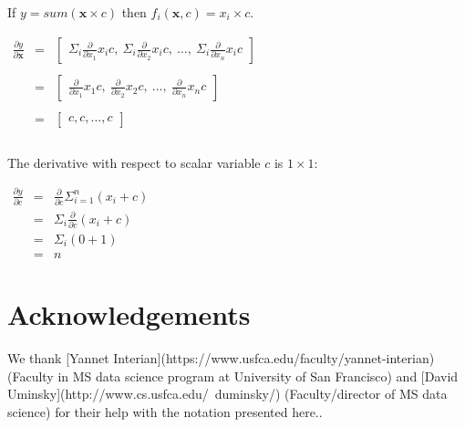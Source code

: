 \documentclass[11pt]{article}
\begin{document}
If $y = sum(\mathbf{x} \times c)$ then $f_i(\mathbf{x},c) = x_i \times c$.

$
\begin{array}{lcl}
\frac{\partial y}{\partial \mathbf{x}} & = & \begin{bmatrix} \Sigma_i \frac{\partial}{\partial x_1} x_i c,~ \Sigma_i \frac{\partial }{\partial x_2} x_i c,~ \ldots,~ \Sigma_i \frac{\partial}{\partial x_n} x_i c  \end{bmatrix}\\\\
 & = & \begin{bmatrix} \frac{\partial}{\partial x_1} x_1 c,~ \frac{\partial }{\partial x_2} x_2 c,~ \ldots,~ \frac{\partial}{\partial x_n} x_n c  \end{bmatrix}\\\\
 & = & \begin{bmatrix} c, c, \ldots, c \end{bmatrix}\\\\
\end{array}
$

The derivative with respect to scalar variable $c$ is $1 \times 1$:

$
\begin{array}{lcl}
\frac{\partial y}{\partial c} & = & \frac{\partial}{\partial c} \Sigma_{i=1}^n (x_i+c)\\
& = & \Sigma_i \frac{\partial}{\partial c} (x_i+c)\\
& = & \Sigma_i (0 + 1)\\
& = & n
\end{array}
$

\section{Acknowledgements}

We thank [Yannet Interian](https://www.usfca.edu/faculty/yannet-interian) (Faculty in MS data science program at University of San Francisco) and [David Uminsky](http://www.cs.usfca.edu/~duminsky/) (Faculty/director of MS data science) for their help with the notation presented here..
\end{document}
